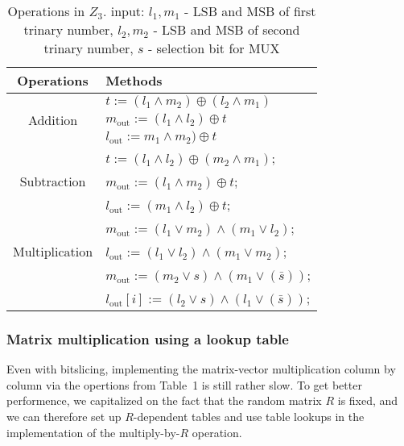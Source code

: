 \begin{table}[ht]
	\caption{Operations in $Z_3$. input:   ${l_1}, {m_1}$ - LSB and MSB  of first trinary number, 
		${l_2}, {m_2}$ - LSB and MSB  of second trinary number,  ${s}$ - selection bit for MUX}
	\begin{center}
		\begin{tabular}{|c|l|}
			\hline
			\textbf{Operations} & \textbf{Methods}\\
			\hline
			\multirow{3}{*}{Addition} & ${t} := ({l_1 \wedge m_2}) \oplus ({l_2 \wedge m_1})$\\
			& $m_{\mathrm{out}} := ( l_1 \wedge  l_2 ) \oplus  t $ \\
			& $l_{\mathrm{out}} :=m_1 \wedge m_2 ) \oplus t $ \\
			\hline
			\multirow{3}{*}{Subtraction} & ${t} := ({l_1} \wedge {l_2}) \oplus ({m_2} \wedge {m_1})$;\\
			& $m_{\mathrm{out}} := (l_1 \wedge m_2 ) \oplus t$;\\
			& $l_{\mathrm{out}} := (m_1 \wedge l_2 ) \oplus t$; \\
			\hline
			\multirow{3}{*}{Multiplication} & $m_{\mathrm{out}}:= (l_1 \vee m_2) \wedge   (m_1 \vee l_2)$; \\
			& $l_{\mathrm{out}} := (l_1 \vee l_2) \wedge     (m_1 \vee m_2)$;\\
			\hline
			\multirow{3}{*}{MUX} & $m_{\mathrm{out}} :=( m_2 \vee s) \wedge (m_1 \vee (\bar{s}) )$; \\
			& $l_{\mathrm{out}}[i] :=( l_2 \vee s) \wedge (l_1 \vee (\bar{s}) )$; \\
			\hline
			
		\end{tabular}
	\end{center}
	\label{tab:multicol}
\end{table}



\subsubsection{Matrix multiplication using a lookup table}

Even with bitslicing, implementing the matrix-vector multiplication column by column via the opertions from Table~1 is still rather slow.
To get better performence, we capitalized on the fact that the random matrix $R$ is fixed, and we can therefore set up $R$-dependent tables and use table lookups in the implementation of the multiply-by-$R$ operation.

